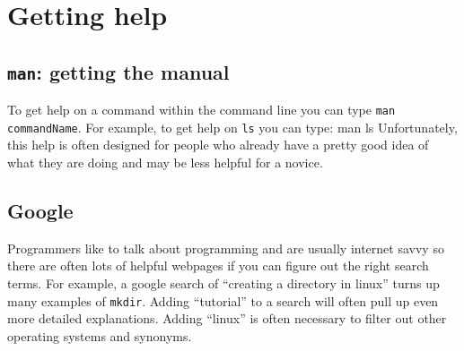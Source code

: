 \documentclass[12pt]{article}
\newenvironment{cmd}{\verbatim}{\endverbatim\vspace{5pt}}
\begin{document}
\section*{Getting help}
\subsection*{\texttt{man}: getting the manual}
To get help on a command within the command line you can type \texttt{man commandName}. For example, to get help on \texttt{ls} you can type:
\begin{cmd}
  man ls
\end{cmd}
Unfortunately, this help is often designed for people who already have a pretty good idea of what they are doing and may be less helpful for a novice.

\subsection*{Google}
Programmers like to talk about programming and are usually internet savvy so there are often lots of helpful webpages if you can figure out the right search terms. For example, a google search of ``creating a directory in linux'' turns up many examples of \texttt{mkdir}. Adding ``tutorial'' to a search will often pull up even more detailed explanations. Adding ``linux'' is often necessary to filter out other operating systems and synonyms.
\end{document}
